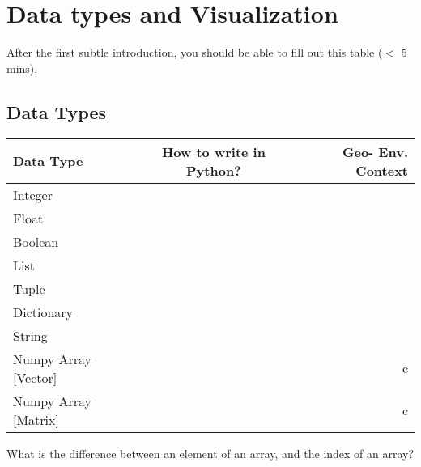 
\section{Data types and Visualization}
After the first subtle introduction, you should be able to fill out this table ($<$ 5 mins).
\subsection{Data Types}

    \begin{center}
      \label{tab:table1}
      \begin{tabular}{l|c|r} %
        \textbf{Data Type} & \textbf{How to write in Python?} & \textbf{Geo- Env. Context}\\
        \hline
        Integer &  & \\
        Float &  & \\
        Boolean &  & \\
        List &  & \\
        Tuple &  & \\
        Dictionary &  & \\
        String &  & \\
        Numpy Array [Vector] &  & c\\
        Numpy Array [Matrix] &  & c\\
      \end{tabular}
    \end{center}
    What is the difference between an element of an array, and the index of an array?

